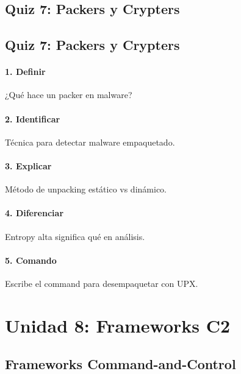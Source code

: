 \documentclass[
  letterpaper,
]{report}
\begin{document}
\chapter{Quiz 7: Packers y Crypters}\label{quiz-7-packers-y-crypters}

\chapter{Quiz 7: Packers y Crypters}\label{quiz-7-packers-y-crypters-1}

\subsection{1. Definir}\label{definir}

¿Qué hace un packer en malware?

\subsection{2. Identificar}\label{identificar-2}

Técnica para detectar malware empaquetado.

\subsection{3. Explicar}\label{explicar-2}

Método de unpacking estático vs dinámico.

\subsection{4. Diferenciar}\label{diferenciar}

Entropy alta significa qué en análisis.

\subsection{5. Comando}\label{comando-5}

Escribe el command para desempaquetar con UPX.

\part{Unidad 8: Frameworks C2}

\chapter{Frameworks
Command-and-Control}\label{frameworks-command-and-control}
\end{document}
